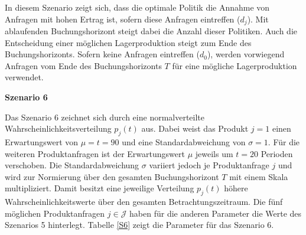 In diesem Szenario zeigt sich, dass die optimale Politik die Annahme von Anfragen mit hohen Ertrag ist, sofern diese Anfragen eintreffen ($d_j$). Mit ablaufenden Buchungshorizont steigt dabei die Anzahl dieser Politiken. Auch die Entscheidung einer möglichen Lagerproduktion steigt zum Ende des Buchungshorizonts. Sofern keine Anfragen eintreffen ($d_0$), werden vorwiegend Anfragen vom Ende des Buchungshorizonts $T$ für eine mögliche Lagerproduktion verwendet.

\textbf{Szenario 6}

Das Szenario 6 zeichnet sich durch eine normalverteilte Wahrscheinlichkeitsverteilung $p_j(t)$ aus. Dabei weist das Produkt $j=1$ einen Erwartungswert von $\mu=t=90$ und eine Standardabweichung von $\sigma=1$. Für die weiteren Produktanfragen ist der Erwartungswert $\mu$ jeweils um $t=20$ Perioden verschoben. Die Standardabweichung $\sigma$ variiert jedoch je Produktanfrage $j$ und wird zur Normierung über den gesamten Buchungshorizont $T$ mit einem Skala multipliziert. Damit besitzt eine jeweilige Verteilung $p_j(t)$ höhere Wahrscheinlichkeitswerte über den gesamten Betrachtungszeitraum. Die fünf möglichen Produktanfragen $j\in\mathcal{J}$ haben für die anderen Parameter die Werte des Szenarios 5 hinterlegt. Tabelle \ref{S6} zeigt die Parameter für das Szenario 6.

